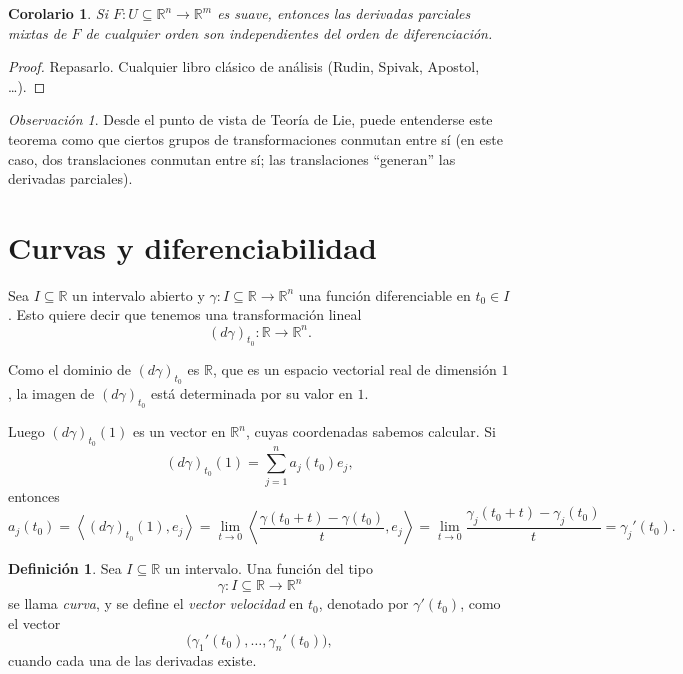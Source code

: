 \documentclass[11pt]{article}
\newtheorem*{corollary}{Corolario}
\theoremstyle{definition}
\newtheorem*{definition}{Definici\'on}
\theoremstyle{remark}
\newtheorem*{remark}{Observaci\'on}
\begin{document}
\begin{corollary}
Si $F:U\subseteq \mathbb{R}^n\to \mathbb{R}^m$ es suave, entonces las derivadas parciales mixtas de $F$ de cualquier orden son independientes del orden de diferenciaci\'on.
\end{corollary}

\begin{proof}
Repasarlo. Cualquier libro cl\'asico de an\'alisis (Rudin, Spivak, Apostol, \dots).
\end{proof}

\begin{remark}
Desde el punto de vista de Teor\'ia de Lie, puede entenderse este teorema como que ciertos grupos de transformaciones conmutan entre s\'i (en este caso, dos translaciones conmutan entre s\'i; las translaciones ``generan'' las derivadas parciales).
\end{remark}

\section*{Curvas y diferenciabilidad}

Sea $I\subseteq \mathbb{R}$ un intervalo abierto y $\gamma:I\subseteq \mathbb{R}\to \mathbb{R}^n$ una funci\'on diferenciable en $t_0\in I$. Esto quiere decir que tenemos una transformaci\'on lineal
\[
(d\gamma)_{t_0}:\mathbb{R}\longrightarrow \mathbb{R}^n.
\]

Como el dominio de $(d\gamma)_{t_0}$ es $\mathbb{R}$, que es un espacio vectorial real de dimensi\'on $1$, la imagen de $(d\gamma)_{t_0}$ est\'a determinada por su valor en $1$.

Luego $(d\gamma)_{t_0}(1)$ es un vector en $\mathbb{R}^n$, cuyas coordenadas sabemos calcular. Si
\[
(d\gamma)_{t_0}(1)=\sum_{j=1}^n a_j(t_0)e_j,
\]
entonces
\[
a_j(t_0)
=
\left\langle (d\gamma)_{t_0}(1),e_j\right\rangle
=
\lim_{t\to 0}\left\langle \frac{\gamma(t_0+t)-\gamma(t_0)}{t},e_j\right\rangle
=
\lim_{t\to 0}\frac{\gamma_j(t_0+t)-\gamma_j(t_0)}{t}
=
\gamma_j'(t_0).
\]

\begin{definition}
Sea $I\subseteq \mathbb{R}$ un intervalo. Una funci\'on del tipo
\[
\gamma:I\subseteq \mathbb{R}\longrightarrow \mathbb{R}^n
\]
se llama \emph{curva}, y se define el \emph{vector velocidad} en $t_0$, denotado por $\gamma'(t_0)$, como el vector
\[
\bigl(\gamma_1'(t_0),\dots,\gamma_n'(t_0)\bigr),
\]
cuando cada una de las derivadas existe.
\end{definition}
\end{document}
